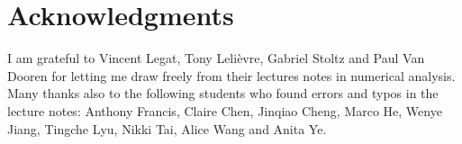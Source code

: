 \chapter*{Acknowledgments}%
\label{cha:acknowledgements}

I am grateful to Vincent Legat, Tony Lelièvre, Gabriel Stoltz and Paul Van Dooren for letting me draw freely from their lectures notes in numerical analysis.
Many thanks also to the following students who found errors and typos in the lecture notes:
Anthony Francis, Claire Chen, Jinqiao Cheng, Marco He, Wenye Jiang, Tingche Lyu, Nikki Tai, Alice Wang and Anita Ye.
